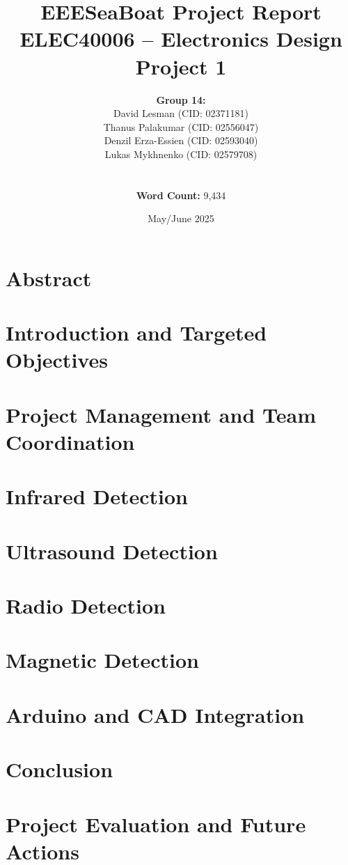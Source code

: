 \documentclass[12pt,a4paper]{report}
\title{\textbf{EEESeaBoat Project Report} \\ \large ELEC40006 -- Electronics Design Project 1}
\author{
\textbf{Group 14:} \\ David Lesman (CID: 02371181) \\ Thanus Palakumar (CID: 02556047) \\ Denzil Erza-Essien (CID: 02593040) \\ Lukas Mykhnenko (CID: 02579708) \\ \\ \\
\textbf{Word Count:} 9,434
}
\date{May/June 2025}
\begin{document}
\maketitle
\tableofcontents
\newpage

\chapter{Abstract}


\chapter{Introduction and Targeted Objectives}

\chapter{Project Management and Team Coordination}


\chapter{Infrared Detection}


\chapter{Ultrasound Detection}


\chapter{Radio Detection}


\chapter{Magnetic Detection}


\chapter{Arduino and CAD Integration}


\chapter{Conclusion}


\chapter{Project Evaluation and Future Actions}

\end{document}
